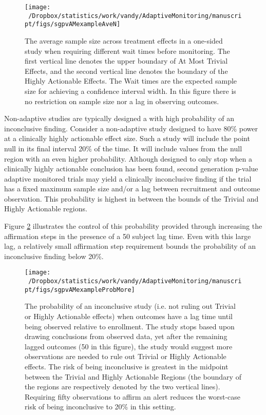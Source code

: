 \documentclass[12pt,oneside]{book}
\newlength{\li}\setlength{\li}{14.48pt}
\newlength{\di}\setlength{\di}{-3.5mm}
\theoremstyle{definition}
\theoremstyle{definition}
\theoremstyle{definition}
\theoremstyle{remark}
\begin{document}
\begin{figure}[H]

{\centering \texttt{[image: ~/Dropbox/statistics/work/vandy/AdaptiveMonitoring/manuscript/figs/sgpvAMexampleAveN]} 

}

\caption{The average sample size across treatment effects in a one-sided study when requiring different wait times before monitoring.  The first vertical line denotes the upper boundary of At Most Trivial Effects, and the second vertical line denotes the boundary of the Highly Actionable Effects.  The Wait times are the expected sample size for achieving a confidence interval width.  In this figure there is no restriction on sample size nor a lag in observing outcomes.}\label{fig:exampleAveN}
\end{figure}

Non-adaptive studies are typically designed a with high probability of
an inconclusive finding. Consider a non-adaptive study designed to have
80\% power at a clinically highly actionable effect size. Such a study
will include the point null in its final interval 20\% of the time. It
will include values from the null region with an even higher
probability. Although designed to only stop when a clinically highly
actionable conclusion has been found, second generation p-value adaptive
monitored trials may yield a clinically inconclusive finding if the
trial has a fixed maximum sample size and/or a lag between recruitment
and outcome observation. This probability is highest in between the
bounds of the Trivial and Highly Actionable regions.

Figure \ref{fig:exampleMore} illustrates the control of this probability
provided through increasing the affirmation steps in the presence of a
50 subject lag time. Even with this large lag, a relatively small
affirmation step requirement bounds the probability of an inconclusive
finding below 20\%.

\begin{figure}[H]

{\centering \texttt{[image: ~/Dropbox/statistics/work/vandy/AdaptiveMonitoring/manuscript/figs/sgpvAMexampleProbMore]} 

}

\caption{The probability of an inconclusive study (i.e. not ruling out Trivial or Highly Actionable effects) when outcomes have a lag time until being observed relative to enrollment.  The study stops based upon drawing conclusions from observed data, yet after the remaining lagged outcomes (50 in this figure), the study would suggest more observations are needed to rule out Trivial or Highly Actionable effects.  The risk of being inconclusive is greatest in the midpoint between the Trivial and Highly Actionable Regions (the boundary of the regions are respectively denoted by the two vertical lines). Requiring fifty observations to affirm an alert reduces the worst-case risk of being inconclusive to 20\% in this setting.}\label{fig:exampleMore}
\end{figure}
\end{document}

